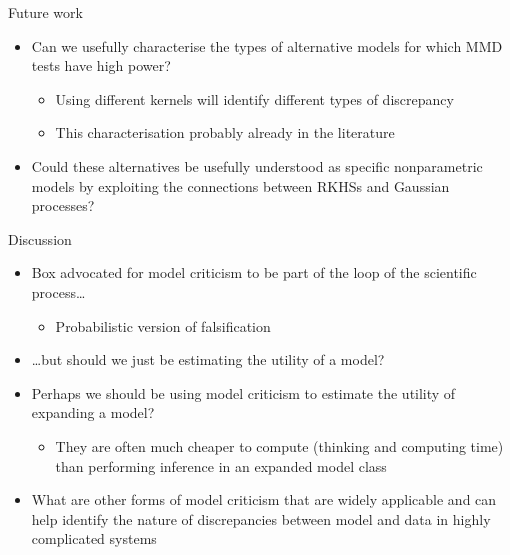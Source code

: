 \begin{frame}{Future work}
  \begin{itemize}
    \item Can we usefully characterise the types of alternative models for which MMD tests have high power?
    \begin{itemize}
      \pause
      \item Using different kernels will identify different types of discrepancy
      \pause
      \item This characterisation probably already in the literature 
    \end{itemize}
    \vspace{\baselineskip}
    \pause
    \item Could these alternatives be usefully understood as specific nonparametric models by exploiting the connections between RKHSs and Gaussian processes?
  \end{itemize}
\end{frame}

\begin{frame}{Discussion}
  \begin{itemize}
    \item Box advocated for model criticism to be part of the loop of the scientific process\dots
    \begin{itemize}
      \item Probabilistic version of falsification
    \end{itemize}
    \vspace{\baselineskip}
    \pause
    \item \dots but should we just be estimating the utility of a model?
    \vspace{\baselineskip}
    \pause
    \item Perhaps we should be using model criticism to estimate the utility of expanding a model?
    \begin{itemize}
      \item They are often much cheaper to compute (thinking and computing time) than performing inference in an expanded model class
    \end{itemize}
    \vspace{\baselineskip}
    \pause
    \item What are other forms of model criticism that are widely applicable and can help identify the nature of discrepancies between model and data in highly complicated systems
  \end{itemize}
\end{frame}

